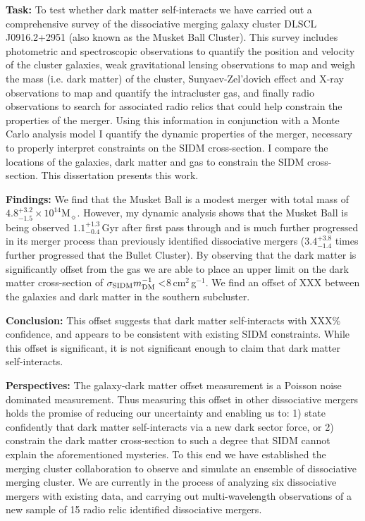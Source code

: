 \noindent\textbf{Task:} 
To test whether dark matter self-interacts we have carried out a comprehensive survey of the dissociative merging galaxy cluster DLSCL J0916.2+2951 (also known as the Musket Ball Cluster).
This survey includes photometric and spectroscopic observations to quantify the position and velocity of the cluster galaxies,
weak gravitational lensing observations to map and weigh the mass (i.e. dark matter) of the cluster,
Sunyaev-Zel'dovich effect and X-ray observations to map and quantify the intracluster gas,
and finally radio observations to search for associated radio relics that could help constrain the properties of the merger.
Using this information in conjunction with a Monte Carlo analysis model I quantify the dynamic properties of the merger, necessary to properly interpret constraints on the SIDM cross-section.
I compare the locations of the galaxies, dark matter and gas to constrain the SIDM cross-section.
This dissertation presents this work.

\noindent\textbf{Findings:} 
We find that the Musket Ball is a modest merger with total mass of  $4.8^{+3.2}_{-1.5}\times 10^{14}$M$_\sun$.
However, my dynamic analysis shows that the Musket Ball is being observed $1.1^{+1.3}_{-0.4}$\,Gyr after first pass through and is much further progressed in its merger process than previously identified dissociative mergers ($3.4^{+3.8}_{-1.4}$ times further progressed that the Bullet Cluster). 
By observing that the dark matter is significantly offset from the gas we are able to place an upper limit on the dark matter cross-section of $\sigma_{\rm SIDM}m^{-1}_{\rm DM} <$8\,cm$^2$\,g$^{-1}$.
We find an offset of XXX between the galaxies and dark matter in the southern subcluster.


\noindent\textbf{Conclusion:}
This offset suggests that dark matter self-interacts with XXX\% confidence, and appears to be consistent with existing SIDM constraints.
While this offset is significant, it is not significant enough to claim that dark matter self-interacts.

\noindent\textbf{Perspectives:}
The galaxy-dark matter offset measurement is a Poisson noise dominated measurement.
Thus measuring this offset in other dissociative mergers holds the promise of reducing our uncertainty and enabling us to: 1) state confidently that dark matter self-interacts via a new dark sector force, or 2) constrain the dark matter cross-section to such a degree that SIDM cannot explain the aforementioned mysteries.
To this end we have established the merging cluster collaboration to observe and simulate an ensemble of dissociative merging cluster.
We are currently in the process of analyzing six dissociative mergers with existing data, and carrying out multi-wavelength observations of a new sample of 15 radio relic identified dissociative mergers.